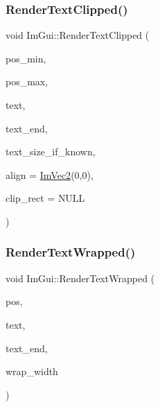 \mbox{\label{namespace_im_gui_ab362eafae794c7364a6b96ea06f38eb9}} 
\subsubsection{\texorpdfstring{Render\+Text\+Clipped()}{RenderTextClipped()}}
{\footnotesize\ttfamily void Im\+Gui\+::\+Render\+Text\+Clipped (\begin{DoxyParamCaption}\item[{const \mbox{\hyperlink{struct_im_vec2}{Im\+Vec2}} \&}]{pos\+\_\+min,  }\item[{const \mbox{\hyperlink{struct_im_vec2}{Im\+Vec2}} \&}]{pos\+\_\+max,  }\item[{const char $\ast$}]{text,  }\item[{const char $\ast$}]{text\+\_\+end,  }\item[{const \mbox{\hyperlink{struct_im_vec2}{Im\+Vec2}} $\ast$}]{text\+\_\+size\+\_\+if\+\_\+known,  }\item[{const \mbox{\hyperlink{struct_im_vec2}{Im\+Vec2}} \&}]{align = {\ttfamily \mbox{\hyperlink{struct_im_vec2}{Im\+Vec2}}(0,0)},  }\item[{const \mbox{\hyperlink{struct_im_rect}{Im\+Rect}} $\ast$}]{clip\+\_\+rect = {\ttfamily NULL} }\end{DoxyParamCaption})}

\mbox{\label{namespace_im_gui_aa483b40f6899e1b289b4bf6c2673d1d2}} 
\subsubsection{\texorpdfstring{Render\+Text\+Wrapped()}{RenderTextWrapped()}}
{\footnotesize\ttfamily void Im\+Gui\+::\+Render\+Text\+Wrapped (\begin{DoxyParamCaption}\item[{\mbox{\hyperlink{struct_im_vec2}{Im\+Vec2}}}]{pos,  }\item[{const char $\ast$}]{text,  }\item[{const char $\ast$}]{text\+\_\+end,  }\item[{float}]{wrap\+\_\+width }\end{DoxyParamCaption})}

